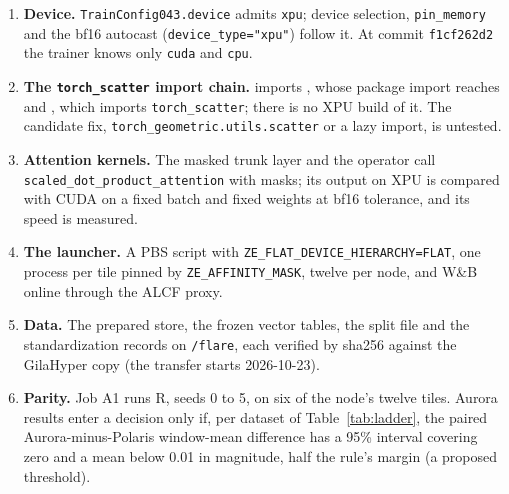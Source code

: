 \begin{enumerate}[leftmargin=*,itemsep=2pt]
\item \textbf{Device.} \texttt{TrainConfig043.device} admits \texttt{xpu}; device selection,
\texttt{pin\_memory} and the bf16 autocast (\texttt{device\_type="xpu"}) follow it. At commit
\texttt{f1cf262d2} the trainer knows only \texttt{cuda} and \texttt{cpu}.
\item \textbf{The \texttt{torch\_scatter} import chain.}  imports
, whose package import reaches
 and , which imports \texttt{torch\_scatter};
there is no XPU build of it. The candidate fix, \texttt{torch\_geometric.utils.scatter} or a
lazy import, is untested.
\item \textbf{Attention kernels.} The masked trunk layer and the operator call
\texttt{scaled\_dot\_product\_attention} with masks; its output on XPU is compared with CUDA on
a fixed batch and fixed weights at bf16 tolerance, and its speed is measured.
\item \textbf{The launcher.} A PBS script with \texttt{ZE\_FLAT\_DEVICE\_HIERARCHY=FLAT}, one
process per tile pinned by \texttt{ZE\_AFFINITY\_MASK}, twelve per node, and W\&B online through
the ALCF proxy.
\item \textbf{Data.} The prepared store, the frozen vector tables, the split file and the
standardization records on \texttt{/flare}, each verified by sha256 against the GilaHyper copy
(the transfer starts 2026-10-23).
\item \textbf{Parity.} Job A1 runs R, seeds 0 to 5, on six of the node's twelve tiles. Aurora results enter
a decision only if, per dataset of Table~\ref{tab:ladder}, the paired Aurora-minus-Polaris
window-mean difference has a 95\% interval covering zero and a mean below 0.01 in magnitude, half
the rule's margin (a proposed threshold).
\end{enumerate}


